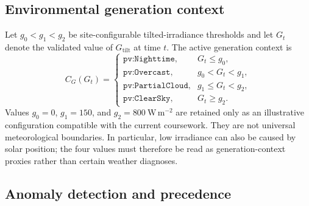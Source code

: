 \documentclass[
	letterpaper,
	10pt,
	unnumberedsections,
	twoside,
]{LTJournalArticle}
\newcommand{\valueof}[1]{\texttt{pv:#1}}
\begin{document}
\subsection{Environmental generation context}

Let $g_0<g_1<g_2$ be site-configurable tilted-irradiance thresholds and let $G_t$ denote the validated value of $G_{\mathrm{tilt}}$ at time $t$. The active generation context is
\begin{equation}
\label{eq:generation-context}
C_G(G_t)=
\begin{cases}
\valueof{Nighttime}, & G_t\leq g_0,\\
\valueof{Overcast}, & g_0<G_t<g_1,\\
\valueof{PartialCloud}, & g_1\leq G_t<g_2,\\
\valueof{ClearSky}, & G_t\geq g_2.
\end{cases}
\end{equation}
Values $g_0=0$, $g_1=150$, and $g_2=800\ \mathrm{W\,m^{-2}}$ are retained only as an illustrative configuration compatible with the current coursework. They are not universal meteorological boundaries. In particular, low irradiance can also be caused by solar position; the four values must therefore be read as generation-context proxies rather than certain weather diagnoses.

\subsection{Anomaly detection and precedence}
\end{document}
